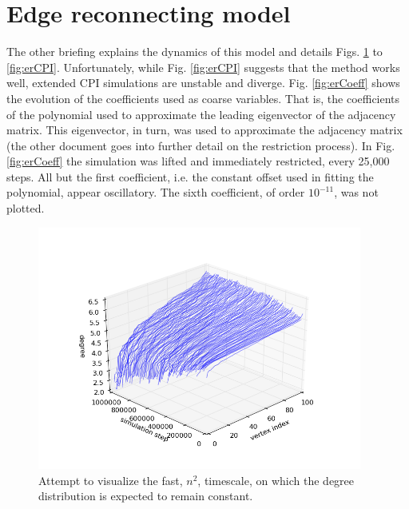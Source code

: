 \documentclass[11pt]{article}
\begin{document}
\clearpage

\section*{Edge reconnecting model}

The other briefing explains the dynamics of this model and details Figs. \ref{fig:erFast} to \ref{fig:erCPI}. Unfortunately, while Fig. \ref{fig:erCPI} suggests that the method works well, extended CPI simulations are unstable and diverge. Fig. \ref{fig:erCoeff} shows the evolution of the coefficients used as coarse variables. That is, the coefficients of the polynomial used to approximate the leading eigenvector of the adjacency matrix. This eigenvector, in turn, was used to approximate the adjacency matrix (the other document goes into further detail on the restriction process). In Fig. \ref{fig:erCoeff} the simulation was lifted and immediately restricted, every 25,000 steps. All but the first coefficient, i.e. the constant offset used in fitting the polynomial, appear oscillatory. The sixth coefficient, of order $10^{-11}$, was not plotted.

\begin{figure}[h!]
  \centering
  \includegraphics[height=80mm]{erQuadraticTimescale}
  \caption{Attempt to visualize the fast, $n^{2}$, timescale, on which the degree distribution is expected to remain constant.}
  \label{fig:erFast}
\end{figure}
\end{document}
